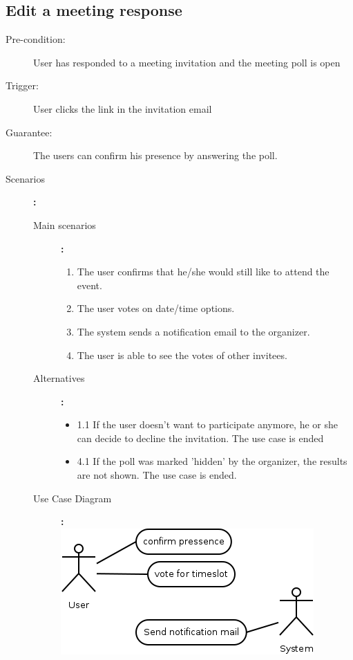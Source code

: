 \subsection{Edit a meeting response}

\begin{description}
	\item[Pre-condition:] User has responded to a meeting invitation and the meeting poll is open
	\item[Trigger:] User clicks the link in the invitation email
	\item[Guarantee:] The users can confirm his presence by answering the poll.
	\item[Scenarios]\textbf{:}\\
				\begin{description}
					\item[Main scenarios]\textbf{:}\\
								\begin{enumerate}
									\item The user confirms that he/she would still like to attend the event.
									\item The user votes on date/time options.
									\item The system sends a notification email to the organizer.
									\item The user is able to see the votes of other invitees.
								\end{enumerate}
					\item[Alternatives]\textbf{:}\\
								\begin{itemize}
									\item 1.1 If the user doesn't want to participate anymore, he or she can decide to decline the invitation. The use case is ended
									\item 4.1 If the poll was marked 'hidden' by the organizer, the results are not shown. The use case is ended.
								\end{itemize}
					\item[Use Case Diagram]\textbf{:}\\
						\includegraphics[scale=0.5]{ucd/Diagram2.png}
				\end{description}
\end{description}

